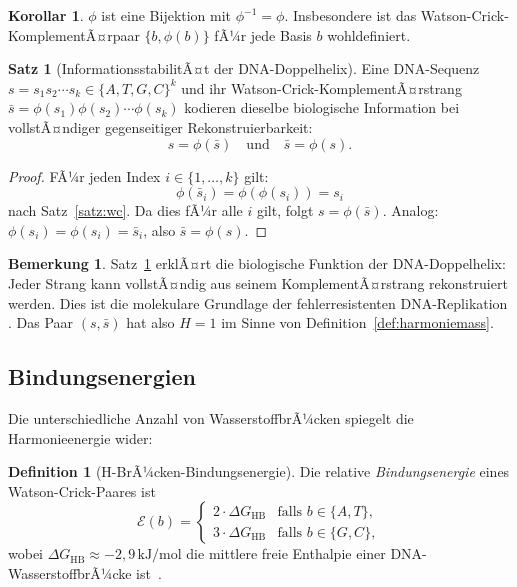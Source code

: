 ﻿\documentclass[a4paper,12pt]{article}
\theoremstyle{definition}
\newtheorem{definition}{Definition}
\newtheorem{satz}{Satz}
\newtheorem{bemerkung}{Bemerkung}
\newtheorem{korollar}{Korollar}
\begin{document}
\begin{korollar}
	$\phi$ ist eine Bijektion mit $\phi^{-1} = \phi$. Insbesondere ist das
	Watson-Crick-KomplementÃ¤rpaar $\{b, \phi(b)\}$ fÃ¼r jede Basis $b$ wohldefiniert.
\end{korollar}

\begin{satz}[InformationsstabilitÃ¤t der DNA-Doppelhelix]
	\label{satz:dna_info}
	Eine DNA-Sequenz $s = s_1 s_2 \cdots s_k \in \{A,T,G,C\}^k$ und ihr
	Watson-Crick-KomplementÃ¤rstrang $\bar{s} = \phi(s_1)\phi(s_2)\cdots\phi(s_k)$
	kodieren dieselbe biologische Information bei vollstÃ¤ndiger gegenseitiger
	Rekonstruierbarkeit:
	\[
		s = \phi(\bar{s}) \quad \text{und} \quad \bar{s} = \phi(s).
	\]
\end{satz}

\begin{proof}
	FÃ¼r jeden Index $i \in \{1,\ldots,k\}$ gilt:
	\[
		\phi(\bar{s}_i) = \phi(\phi(s_i)) = s_i
	\]
	nach Satz~\ref{satz:wc}. Da dies fÃ¼r alle $i$ gilt, folgt $s = \phi(\bar{s})$.
	Analog: $\phi(s_i) = \phi(s_i) = \bar{s}_i$, also $\bar{s} = \phi(s)$. \qedhere
\end{proof}

\begin{bemerkung}
	Satz~\ref{satz:dna_info} erklÃ¤rt die biologische Funktion der DNA-Doppelhelix:
	Jeder Strang kann vollstÃ¤ndig aus seinem KomplementÃ¤rstrang rekonstruiert werden.
	Dies ist die molekulare Grundlage der fehlerresistenten DNA-Replikation \cite{alberts2015}.
	Das Paar $(s, \bar{s})$ hat also $H = 1$ im Sinne von Definition~\ref{def:harmoniemass}.
\end{bemerkung}

\subsection{Bindungsenergien}

Die unterschiedliche Anzahl von WasserstoffbrÃ¼cken spiegelt die Harmonieenergie wider:

\begin{definition}[H-BrÃ¼cken-Bindungsenergie]
	Die relative \emph{Bindungsenergie} eines Watson-Crick-Paares ist
	\[
		\mathcal{E}(b) =
		\begin{cases}
			2 \cdot \Delta G_{\mathrm{HB}} & \text{falls } b \in \{A,T\}, \\
			3 \cdot \Delta G_{\mathrm{HB}} & \text{falls } b \in \{G,C\},
		\end{cases}
	\]
	wobei $\Delta G_{\mathrm{HB}} \approx -2{,}9\,\mathrm{kJ/mol}$ die mittlere
	freie Enthalpie einer DNA-WasserstoffbrÃ¼cke ist~\cite{lehninger2017}.
\end{definition}
\end{document}
